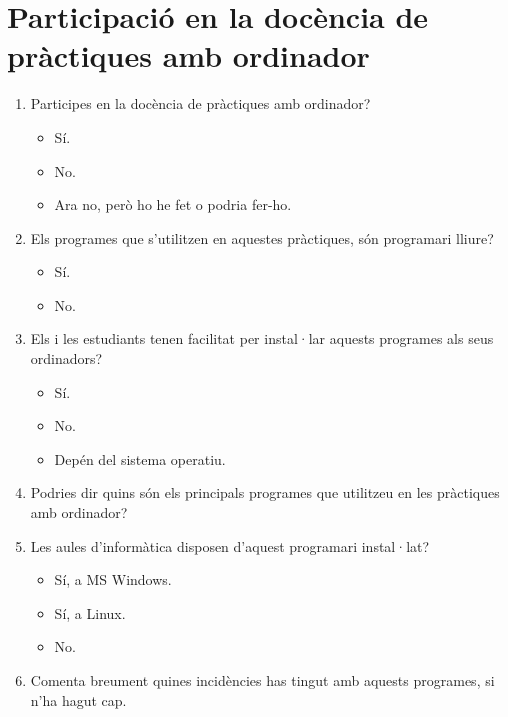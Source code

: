 \documentclass[a4paper,12pt]{article}
\newcounter{preg}[section]
\begin{document}
\section{Participació en la docència de pràctiques amb ordinador}
\begin{enumerate}
\item {} Participes en la docència de pràctiques amb ordinador?
   \begin{itemize}
   \item Sí.
   \item No.
   \item Ara no, però ho he fet o podria fer-ho.
   \end{itemize}

\item {} Els programes que s'utilitzen en aquestes pràctiques, són programari lliure?
   \begin{itemize}
   \item Sí.
   \item No.
   \end{itemize}

\item {} Els i les estudiants tenen facilitat per instal·lar aquests programes als seus ordinadors?
   \begin{itemize}
   \item Sí.
   \item No.
   \item Depén del sistema operatiu.
   \end{itemize}

\item {} Podries dir quins són els principals programes que utilitzeu en les pràctiques amb ordinador?
\vspace*{1cm}

\item {} Les aules d'informàtica disposen d'aquest programari instal·lat?
   \begin{itemize}
   \item Sí, a MS Windows.
   \item Sí, a Linux.
   \item No.
   \end{itemize}

\item Comenta breument quines incidències has tingut amb aquests programes, si n'ha hagut cap.
\vspace*{1cm}
\end{enumerate}
\end{document}
